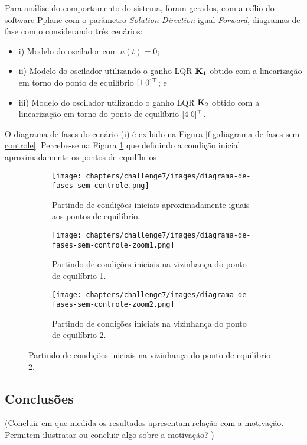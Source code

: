 Para análise do comportamento do sistema, foram gerados, com auxílio do software
Pplane com o parâmetro \textit{Solution Direction} igual \textit{Forward},
diagramas de fase com o considerando três cenários:

\begin{itemize}
    \item i) Modelo do oscilador com $u(t) = 0$;
    \item ii) Modelo do oscilador utilizando o ganho LQR $\mat{K}_1$ obtido com
    a linearização em torno do ponto de equilíbrio $[1 \thickspace 0]^\top$; e
    \item iii) Modelo do oscilador utilizando o ganho LQR $\mat{K}_2$ obtido com
    a linearização em torno do ponto de equilíbrio $[4 \thickspace 0]^\top$.
\end{itemize}

O diagrama de fases do cenário (i) é exibido na Figura
\ref{fig:diagrama-de-fases-sem-controle}. Percebe-se na Figura
\ref{fig:diagrama-de-fases-sem-controle-ponto-de-equilibrio-1-e-2} que definindo
a condição inicial aproximadamente os pontos de equilíbrios 

\begin{figure}[ht]
    \caption{Diagrama de fases do modelo do oscilador com $u(t) = 0$.}
    \label{fig:diagrama-de-fases-sem-controle}
    \centering
    \begin{subfigure}[t]{0.32\textwidth}
        \centering
	    \texttt{[image: chapters/challenge7/images/diagrama-de-fases-sem-controle.png]}
        \caption{Partindo de condições iniciais aproximadamente iguais aos pontos de equilíbrio.}
        \label{fig:diagrama-de-fases-sem-controle-ponto-de-equilibrio-1-e-2}
        
    \end{subfigure}
    \hfill
    \begin{subfigure}[t]{0.32\textwidth}
        \centering
	    \texttt{[image: chapters/challenge7/images/diagrama-de-fases-sem-controle-zoom1.png]}
        \caption{Partindo de condições iniciais na vizinhança do ponto de equilíbrio 1.}
        \label{fig:diagrama-de-fases-sem-controle-ponto-de-equilibrio-1}
    \end{subfigure}
    \hfill
    \begin{subfigure}[t]{0.32\textwidth}
        \centering
	    \texttt{[image: chapters/challenge7/images/diagrama-de-fases-sem-controle-zoom2.png]}
        \caption{Partindo de condições iniciais na vizinhança do ponto de equilíbrio 2.}
        \label{fig:diagrama-de-fases-sem-controle-ponto-de-equilibrio-2}
    \end{subfigure}
\end{figure}

\subsection{Conclusões}
(Concluir em que medida os resultados apresentam relação com a motivação.
Permitem ilustratar ou concluir algo sobre a motivação? )
